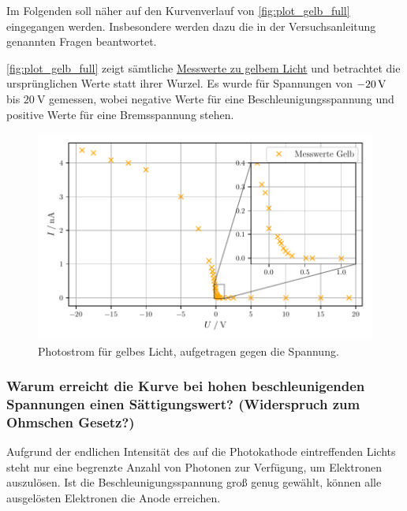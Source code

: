 Im Folgenden soll näher auf den Kurvenverlauf von \autoref{fig:plot_gelb_full} eingegangen werden.
Insbesondere werden dazu die in der Versuchsanleitung genannten Fragen \cite{versuchsanleitung} beantwortet.

\autoref{fig:plot_gelb_full} zeigt sämtliche \hyperref[tab:werte_gelb]{Messwerte zu gelbem Licht}
und betrachtet die ursprünglichen Werte statt ihrer Wurzel.
Es wurde für Spannungen von $\SI{- 20}{\volt}$ bis $\SI{20}{\volt}$ gemessen,
wobei negative Werte für eine Beschleunigungsspannung
und positive Werte für eine Bremsspannung stehen.


\begin{figure}[H]
  \centering
  \includegraphics[width=\textwidth]{build/plot_gelb_full.pdf}
  \caption{Photostrom für gelbes Licht, aufgetragen gegen die Spannung.}
  \label{fig:plot_gelb_full}
\end{figure}

\subsubsection*{Warum erreicht die Kurve bei hohen beschleunigenden Spannungen einen Sättigungswert? (Widerspruch zum Ohmschen Gesetz?)}

Aufgrund der endlichen Intensität des auf die Photokathode eintreffenden Lichts
steht nur eine begrenzte Anzahl von Photonen zur Verfügung, um Elektronen auszulösen.
Ist die Beschleunigungsspannung groß genug gewählt,
können alle ausgelösten Elektronen die Anode erreichen.


